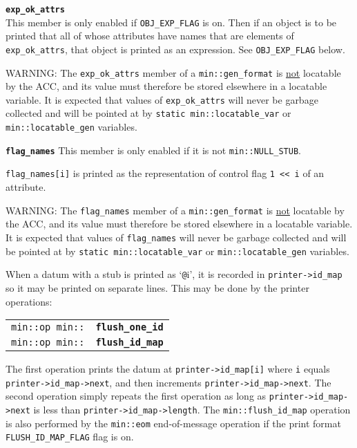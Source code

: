 \documentclass[12pt]{article}
\makeatletter
\newcommand{\TT}[1]{{\tt \bfseries #1}}
\newcommand{\ttmkey}[2]{\TT{#1}\index{#1@{\tt #1}!#2}}
\newcommand{\ttindex}[1]{\index{#1@{\tt #1}}}
\newcommand{\minindex}[1]{\ttindex{min::#1}\ttindex{#1}}
\newcommand{\EOL}{\penalty \exhyphenpenalty}
\newenvironment{indpar}[1][0.3in]%
	{\begin{list}{}%
		     {\setlength{\itemsep}{0in}%
		      \setlength{\topsep}{0in}%
		      \setlength{\parsep}{1ex}%
		      \setlength{\labelwidth}{#1}%
		      \setlength{\leftmargin}{#1}%
		      \addtolength{\leftmargin}{\labelsep}}%
	 \item}%
	{\end{list}}
\newenvironment{itemlist}[1][1.2in]%
	{\begin{list}{}{\setlength{\labelwidth}{#1}%
		        \setlength{\leftmargin}{\labelwidth}%
		        \addtolength{\leftmargin}{+0.2in}%
		        \renewcommand{\makelabel}[1]{##1\hfill}}}%
	{\end{list}}
\newcommand{\LABEL}[1]{\label{#1}}
\newcommand{\MINKEY}[1]{{\tt \bf #1}\minindex{#1}}
\makeatother
\begin{document}
\begin{itemlist}[0.4in]
\item[\ttmkey{exp\_ok\_attrs}{in {\tt min::gen\_format}}]~\\
This member is only enabled if {\tt OBJ\_\EOL EXP\_\EOL FLAG} is on.
Then if an object is to be printed that all of whose attributes have
names that are elements of {\tt exp\_\EOL ok\_\EOL attrs}, that object
is printed as an expression.  See {\tt OBJ\_\EOL EXP\_\EOL FLAG} below.

WARNING: The {\tt exp\_ok\_attrs} member of a {\tt min::gen\_format} is
\underline{not} locatable by the ACC, and its value must therefore be
stored elsewhere in a locatable variable.  It is expected that values of
{\tt exp\_\EOL ok\_\EOL attrs} will never be garbage collected and
will be pointed at by {\tt static min::\EOL locatable\_\EOL var} or
{\tt min::\EOL locatable\_\EOL gen} variables.

\item[\ttmkey{flag\_names}{in {\tt min::gen\_format}}]
This member is only enabled if it
is not {\tt min::\EOL NULL\_\EOL STUB}.

{\tt flag\_names[i]} is printed as the representation of
control flag {\tt 1 <{}< i} of an attribute.

WARNING: The {\tt flag\_\EOL names} member of a {\tt min::gen\_format} is
\underline{not} locatable by the ACC, and its value must therefore be
stored elsewhere in a locatable variable.  It is expected that values of
{\tt flag\_\EOL names} will never be garbage collected and
will be pointed at by {\tt static min::\EOL locatable\_\EOL var} or
{\tt min::\EOL locatable\_\EOL gen} variables.



\end{itemlist}

When a datum with a stub is printed as
`{\tt @}i', it is recorded in {\tt printer->\EOL id\_\EOL map}
so it may be printed on separate lines.  This may be done by
the printer operations:

\begin{indpar}[1em]\begin{tabular}{r@{}l}
\verb|min::op min::| & \MINKEY{flush\_\EOL one\_\EOL id}
\LABEL{MIN::FLUSH_ONE_ID} \\
\verb|min::op min::| & \MINKEY{flush\_\EOL id\_\EOL map}
\LABEL{MIN::FLUSH_ID_MAP} \\
\end{tabular}\end{indpar}

The first operation prints the datum at {\tt printer->\EOL id\_\EOL map[i]}
where {\tt i} equals {\tt printer->\EOL id\_\EOL map->\EOL next}, and then
increments {\tt printer->\EOL id\_\EOL map->\EOL next}.  The second operation
simply repeats the first operation as long as
{\tt printer->\EOL id\_\EOL map->\EOL next}
is less than {\tt printer->\EOL id\_\EOL map->\EOL length}.
The {\tt min::\EOL flush\_\EOL id\_\EOL map} operation is also
performed by the {\tt min::\EOL eom} end-of-message operation
if the print format
{\tt FLUSH\_\EOL ID\_\EOL MAP\_\EOL FLAG} flag is on.
\end{document}
